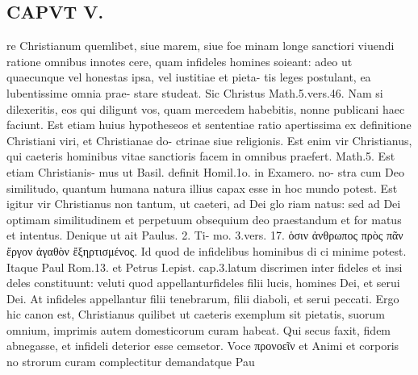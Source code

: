 \documentclass{article}
\begin{document}
\begin{pages}
\section*{CAPVT  V. }
\marginpar{[ p.265 ]}re Christianum quemlibet, siue marem, siue foe minam longe sanctiori viuendi ratione omnibus innotes cere, quam infideles homines soieant: adeo ut quaecunque vel honestas ipsa, vel iustitiae et pieta- tis leges postulant, ea lubentissime omnia prae- stare studeat. Sic Christus Math.5.vers.46. Nam si dilexeritis, eos qui diligunt vos, quam mercedem habebitis, nonne publicani haec faciunt. Est etiam huius hypotheseos et sententiae ratio apertissima ex definitione Christiani viri, et Christianae do- ctrinae siue religionis. Est enim vir Christianus, qui caeteris hominibus vitae sanctioris facem in omnibus praefert. Math.5. Est etiam Christianis- mus ut Basil. definit Homil.1o. in Examero. no- stra cum Deo similitudo, quantum humana natura illius capax esse in hoc mundo potest. Est igitur vir Christianus non tantum, ut caeteri, ad Dei glo riam natus: sed ad Dei optimam similitudinem et perpetuum obsequium deo praestandum et for matus et intentus. Denique ut ait Paulus. 2. Ti- mo. 3.vers. 17. ὁσιν ἀνθρωπος πρὸς πᾶν ἔργον ἀγαθὸν ἔξηρτισμένος. Id quod de infidelibus hominibus di ci minime potest. Itaque Paul Rom.13. et Petrus I.epist. cap.3.latum discrimen inter fideles et insi deles constituunt: veluti quod appellanturfideles filii lucis, homines Dei, et serui Dei. At infideles appellantur filii tenebrarum, filii diaboli, et serui peccati. Ergo hic canon est, Christianus quilibet ut caeteris exemplum sit pietatis, suorum omnium, imprimis autem domesticorum curam habeat. Qui secus faxit, fidem abnegasse, et infideli deterior esse cemsetor. Voce προνοεῖν et Animi et corporis no strorum curam complectitur demandatque Pau 

\end{pages}
\end{document}
